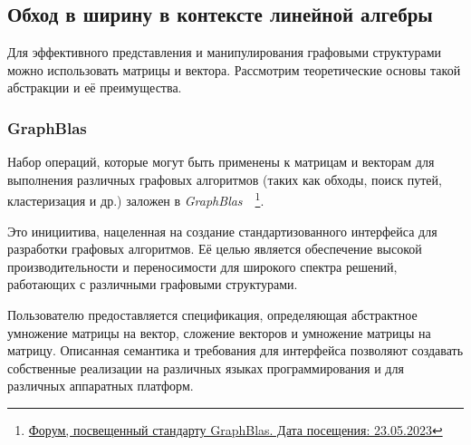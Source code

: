 \subsection{Обход в ширину в контексте линейной алгебры}
Для эффективного представления и манипулирования графовыми структурами можно использовать матрицы и вектора. Рассмотрим теоретические основы такой  абстракции и её преимущества.

\subsubsection{GraphBlas}
Набор операций, которые могут быть применены к матрицам и векторам для выполнения различных графовых алгоритмов (таких как обходы, поиск путей, кластеризация и др.) заложен в \textit{GraphBlas}~\cite{gb_math}~\footnote{\href{https://graphblas.org/}{Форум, посвещенный стандарту GraphBlas. Дата посещения: 23.05.2023}}.

Это инициитива, нацеленная на создание стандартизованного интерфейса для разработки графовых алгоритмов. Её целью является обеспечение высокой производительности и переносимости для широкого спектра решений, работающих с различными графовыми структурами.

Пользователю предоставляется спецификация, определяющая абстрактное умножение матрицы на вектор, сложение векторов и умножение матрицы на матрицу. Описанная семантика и требования для интерфейса позволяют создавать собственные реализации на различных языках программирования и для различных аппаратных платформ. 

